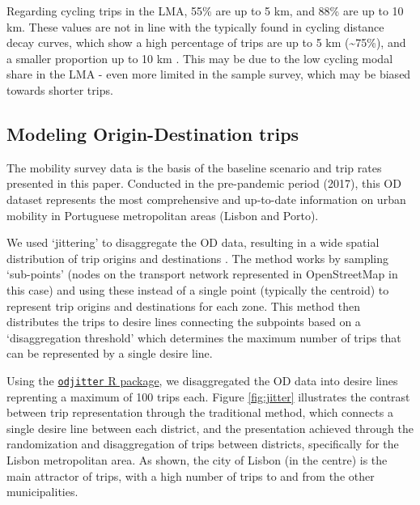 \documentclass[review, doubleblind, 3p,
authoryear]{elsarticle} %
\begin{document}
Regarding cycling trips in the LMA, 55\% are up to 5 km, and 88\% are up
to 10 km. These values are not in line with the typically found in
cycling distance decay curves, which show a high percentage of trips are
up to 5 km (\textasciitilde75\%), and a smaller proportion up to 10 km
\citep{krizek2007detailed, larsen2010beyond, DDfunction2023}. This may
be due to the low cycling modal share in the LMA - even more limited in
the sample survey, which may be biased towards shorter trips.

\subsection{Modeling Origin-Destination
trips}\label{modeling-origin-destination-trips}

The mobility survey data \citep{IMOB} is the basis of the baseline
scenario and trip rates presented in this paper. Conducted in the
pre-pandemic period (2017), this OD dataset represents the most
comprehensive and up-to-date information on urban mobility in Portuguese
metropolitan areas (Lisbon and Porto).

We used `jittering' to disaggregate the OD data, resulting in a wide
spatial distribution of trip origins and destinations
\citep{Lovelace2022Jittering}. The method works by sampling `sub-points'
(nodes on the transport network represented in OpenStreetMap in this
case) and using these instead of a single point (typically the centroid)
to represent trip origins and destinations for each zone. This method
then distributes the trips to desire lines connecting the subpoints
based on a `disaggregation threshold' which determines the maximum
number of trips that can be represented by a single desire line.

Using the
\href{https://github.com/dabreegster/odjitter}{\texttt{odjitter} R
package}, we disaggregated the OD data into desire lines reprenting a
maximum of 100 trips each. Figure \ref{fig:jitter} illustrates the
contrast between trip representation through the traditional method,
which connects a single desire line between each district, and the
presentation achieved through the randomization and disaggregation of
trips between districts, specifically for the Lisbon metropolitan area.
As shown, the city of Lisbon (in the centre) is the main attractor of
trips, with a high number of trips to and from the other municipalities.
\end{document}
